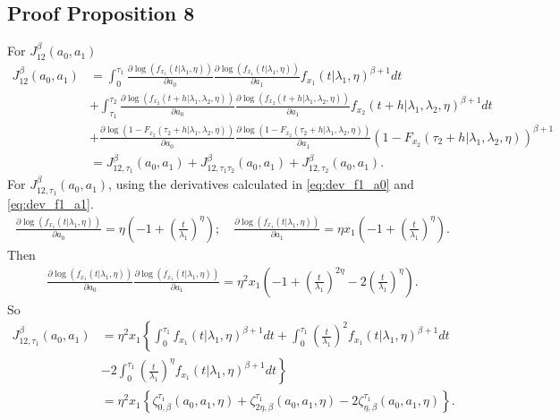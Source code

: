\documentclass{article}
\begin{document}
\subsection{Proof Proposition 8}
For $J_{12}^{\beta}(a_0,a_1)$
\begin{align*}
J_{12}^{\beta}(a_0,a_1)&=\int_{0}^{\tau_1}\frac{\partial \log\left(f_{x_1}(t|\lambda_1,\eta)\right)}{\partial a_0}\frac{\partial \log\left(f_{x_1}(t|\lambda_1,\eta)\right)}{\partial a_1}f_{x_1}(t|\lambda_1,\eta)^{\beta+1}dt
\\
&+\int_{\tau_1}^{\tau_2}\frac{\partial \log\left(f_{x_2}(t+h|\lambda_1,\lambda_2,\eta)\right)}{\partial a_0}\frac{\partial \log\left(f_{x_2}(t+h|\lambda_1,\lambda_2,\eta)\right)}{\partial a_1}f_{x_2}(t+h|\lambda_1,\lambda_2,\eta)^{\beta+1}dt
\\
&+\frac{\partial \log\left(1-F_{x_2}(\tau_2+h|\lambda_1,\lambda_2,\eta)\right)}{\partial a_0}\frac{\partial \log\left(1-F_{x_2}(\tau_2+h|\lambda_1,\lambda_2,\eta)\right)}{\partial a_1}\left(1-F_{x_2}(\tau_2+h|\lambda_1,\lambda_2,\eta)\right)^{\beta+1}
\\
&=J_{12,\tau_1}^{\beta}(a_0,a_1)+J_{12,\tau_1\tau_2}^{\beta}(a_0,a_1)+J_{12,\tau_2}^{\beta}(a_0,a_1).
\end{align*}
For  $J_{12,\tau_1}^{\beta}(a_0,a_1)$, using the derivatives calculated in \ref{eq:dev_f1_a0} and \ref{eq:dev_f1_a1}.
\begin{align*}
\frac{\partial \log\left(f_{x_1}(t|\lambda_1,\eta)\right)}{\partial a_0}=\eta\left(-1+\left(\frac{t}{\lambda_1}\right)^{\eta}\right); \quad \frac{\partial \log\left(f_{x_1}(t|\lambda_1,\eta)\right)}{\partial a_1}=\eta x_1\left(-1+\left(\frac{t}{\lambda_1}\right)^{\eta}\right).
\end{align*}
Then
\begin{align*}
\frac{\partial \log\left(f_{x_1}(t|\lambda_1,\eta)\right)}{\partial a_0}\frac{\partial \log\left(f_{x_1}(t|\lambda_1,\eta)\right)}{\partial a_1}=\eta^2 x_1 \left(-1+\left(\frac{t}{\lambda_1}\right)^{2\eta}-2\left(\frac{t}{\lambda_1}\right)^{\eta}\right).
\end{align*}
So
\begin{align*}
J_{12,\tau_1}^{\beta}(a_0,a_1)&=\eta^2x_1\left\{\int_{0}^{\tau_1}f_{x_1}(t|\lambda_1,\eta)^{\beta+1}dt+\int_{0}^{\tau_1}\left(\frac{t}{\lambda_1}\right)^2f_{x_1}(t|\lambda_1,\eta)^{\beta+1}dt \right.
\\
&\left.-2\int_{0}^{\tau_1}\left(\frac{t}{\lambda_1}\right)^{\eta}f_{x_1}(t|\lambda_1,\eta)^{\beta+1}dt\right\}
\\&=\eta^2x_1\left\{\zeta_{0,\beta}^{\tau_1}(a_0,a_1,\eta)+\zeta_{2\eta,\beta}^{\tau_1}(a_0,a_1,\eta)-2\zeta_{\eta,\beta}^{\tau_1}(a_0,a_1,\eta)\right\}.
\end{align*}
\end{document}
